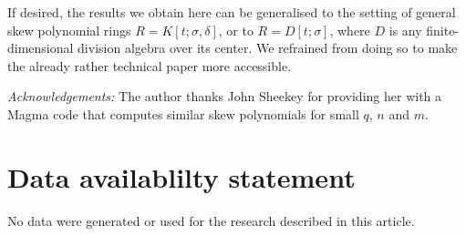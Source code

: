 \documentclass[12pt]{amsart}
\theoremstyle{plain}
\theoremstyle{definition}
\numberwithin{equation}{section}
\numberwithin{figure}{section}
\begin{document}
If desired, the results we obtain here can be generalised to the setting of general skew polynomial rings $R=K[t;\sigma,\delta]$, or to $R=D[t;\sigma]$, where $D$ is any finite-dimensional division algebra over its center. We refrained from doing so to make the already rather technical paper more accessible.

\emph{Acknowledgements:} The author thanks John Sheekey for providing her with a Magma code that computes  similar skew polynomials for small $q$, $n$ and $m$.

\section{Data availablilty statement}
No data were generated or used for the research described in this article.

\end{document}
